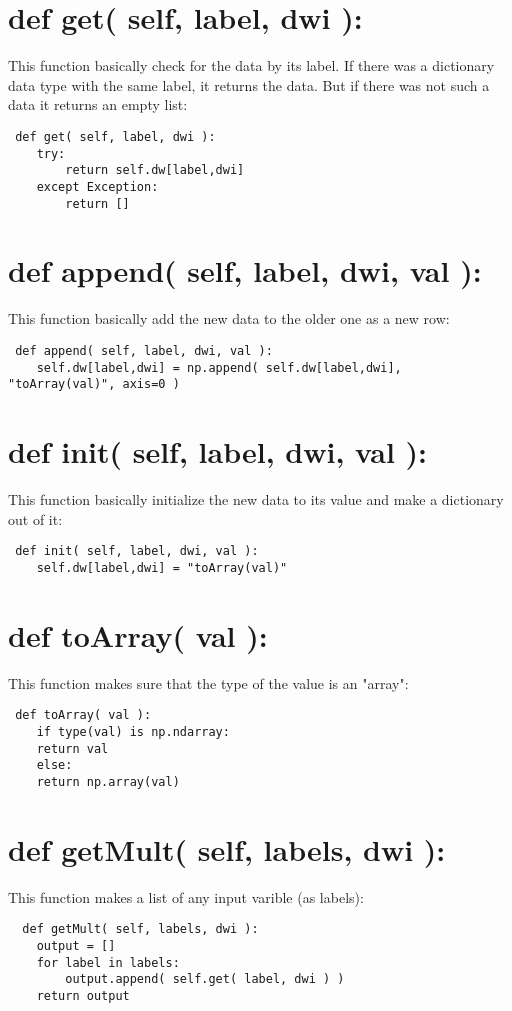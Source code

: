 \documentclass[11pt,fleqn]{book} %
\begin{document}
\section{ def get( self, label, dwi ):}
This function basically check for the data by its label. If there was a dictionary data type with the same label, it returns the data. But if there was not such a data it returns an empty list:
\begin{lstlisting}
 def get( self, label, dwi ):
	try:
	    return self.dw[label,dwi]
	except Exception:
	    return []
\end{lstlisting}
\section{ def append( self, label, dwi, val ):}
This function basically add the new data to the older one as a new row:
\begin{lstlisting}
 def append( self, label, dwi, val ):
	self.dw[label,dwi] = np.append( self.dw[label,dwi], "toArray(val)", axis=0 )
\end{lstlisting}
\section{ def init( self, label, dwi, val ):}
This function basically initialize the new data to its value and make a dictionary out of it:
\begin{lstlisting}
 def init( self, label, dwi, val ):
	self.dw[label,dwi] = "toArray(val)"
\end{lstlisting}
\section{ def toArray( val ):}
This function makes sure that the type of the value is an "array":
\begin{lstlisting}
 def toArray( val ):
    if type(val) is np.ndarray:
	return val
    else:
	return np.array(val)
\end{lstlisting}
\section{ def getMult( self, labels, dwi ):}
This function makes a list of any input varible (as labels):
\begin{lstlisting}
  def getMult( self, labels, dwi ):
	output = []
	for label in labels:
	    output.append( self.get( label, dwi ) )
	return output
\end{lstlisting}
\end{document}

